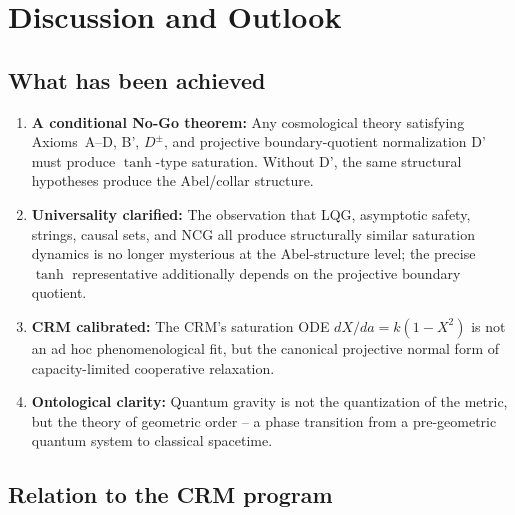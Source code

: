 \documentclass[aps,prd,twocolumn,superscriptaddress,nofootinbib]{revtex4-2}
\begin{document}
\section{Discussion and Outlook}
\label{sec:discussion}

\subsection{What has been achieved}

\begin{enumerate}
\item \textbf{A conditional No-Go theorem:} Any cosmological theory satisfying Axioms~A--D, B', $D^\pm$, and projective boundary-quotient normalization D' must produce $\tanh$-type saturation. Without D', the same structural hypotheses produce the Abel/collar structure.

\item \textbf{Universality clarified:} The observation that LQG, asymptotic safety, strings, causal sets, and NCG all produce structurally similar saturation dynamics is no longer mysterious at the Abel-structure level; the precise $\tanh$ representative additionally depends on the projective boundary quotient.

\item \textbf{CRM calibrated:} The CRM's saturation ODE $dX/da = k(1-X^2)$ is not an ad hoc phenomenological fit, but the canonical projective normal form of capacity-limited cooperative relaxation.

\item \textbf{Ontological clarity:} Quantum gravity is not the quantization of the metric, but the theory of geometric order -- a phase transition from a pre-geometric quantum system to classical spacetime.
\end{enumerate}

\subsection{Relation to the CRM program}
\end{document}
